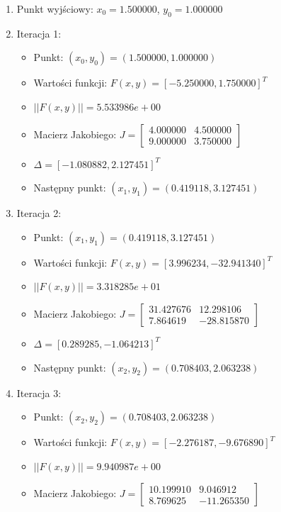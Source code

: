 \documentclass[a4paper,12pt]{article}
\begin{document}
    \begin{enumerate}
    \item Punkt wyjściowy: $x_0 = 1.500000$, $y_0 = 1.000000$
    \item Iteracja 1:
      \begin{itemize}
        \item Punkt: $(x_0, y_0) = (1.500000, 1.000000)$
        \item Wartości funkcji: $F(x,y) = [-5.250000, 1.750000]^T$
        \item $||F(x,y)|| = 5.533986e+00$
        \item Macierz Jakobiego: $J = \begin{bmatrix} 4.000000 & 4.500000 \\ 9.000000 & 3.750000 \end{bmatrix}$
        \item $\Delta = [-1.080882, 2.127451]^T$
        \item Następny punkt: $(x_1, y_1) = (0.419118, 3.127451)$
      \end{itemize}
    \item Iteracja 2:
      \begin{itemize}
        \item Punkt: $(x_1, y_1) = (0.419118, 3.127451)$
        \item Wartości funkcji: $F(x,y) = [3.996234, -32.941340]^T$
        \item $||F(x,y)|| = 3.318285e+01$
        \item Macierz Jakobiego: $J = \begin{bmatrix} 31.427676 & 12.298106 \\ 7.864619 & -28.815870 \end{bmatrix}$
        \item $\Delta = [0.289285, -1.064213]^T$
        \item Następny punkt: $(x_2, y_2) = (0.708403, 2.063238)$
      \end{itemize}
    \item Iteracja 3:
      \begin{itemize}
        \item Punkt: $(x_2, y_2) = (0.708403, 2.063238)$
        \item Wartości funkcji: $F(x,y) = [-2.276187, -9.676890]^T$
        \item $||F(x,y)|| = 9.940987e+00$
        \item Macierz Jakobiego: $J = \begin{bmatrix} 10.199910 & 9.046912 \\ 8.769625 & -11.265350 \end{bmatrix}$

\end{itemize}
\end{enumerate}
\end{document}
